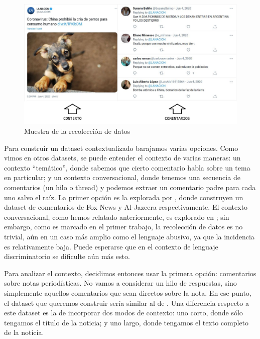 \begin{figure}[t]
    \centering
    \includegraphics[width=\textwidth]{img/idea_dataset.pdf}
    \caption{Muestra de la recolección de datos}
    \label{fig:idea_dataset}
\end{figure}

Para construir un dataset contextualizado barajamos varias opciones. Como vimos en otros datasets, se puede entender el contexto de varias maneras: un contexto ``temático'', donde sabemos que cierto comentario habla sobre un tema en particular; y un contexto conversacional, donde tenemos una secuencia de comentarios (un hilo o thread) y podemos extraer un comentario padre para cada uno salvo el raíz. La primer opción es la explorada por \citet{gao-huang-2017-detecting,mubarak-etal-2017-abusive}, donde construyen un dataset de comentarios de Fox News y Al-Jazeera respectivamente. El contexto conversacional, como hemos relatado anteriormente, es explorado en \citet{pavlopoulos2020toxicity,xenos-2021-context}; sin embargo, como es marcado en el primer trabajo, la recolección de datos es no trivial, aún en un caso más amplio como el lenguaje abusivo, ya que la incidencia es relativamente baja. Puede esperarse que en el contexto de lenguaje discriminatorio se dificulte aún más esto.

Para analizar el contexto, decidimos entonces usar la primera opción: comentarios sobre notas periodísticas. No vamos a considerar un hilo de respuestas, sino simplemente aquellos comentarios que sean directos sobre la nota. En ese punto, el dataset que queremos construir sería similar al de \cite{gao-huang-2017-detecting}. Una diferencia respecto a este dataset es la de incorporar dos modos de contexto: uno corto, donde sólo tengamos el título de la noticia; y uno largo, donde tengamos el texto completo de la noticia.


